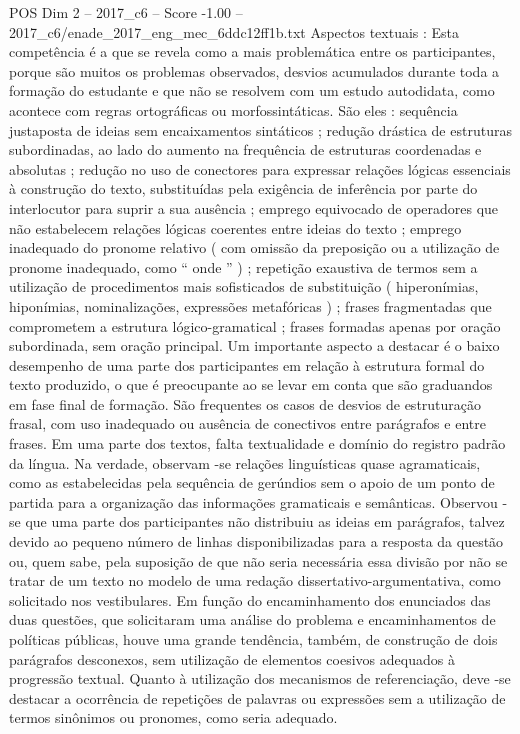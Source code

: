 \begin{textsample}{POS Dim 2 – 2017\_c6 – Score -1.00 – 2017\_c6/enade\_2017\_eng\_mec\_6ddc12ff1b.txt}
Aspectos textuais : Esta competência é a que se revela como a mais problemática entre os participantes, porque são muitos os problemas observados, desvios acumulados durante toda a formação do estudante e que não se resolvem com um estudo autodidata, como acontece com regras ortográficas ou morfossintáticas.
São eles : sequência justaposta de ideias sem encaixamentos sintáticos ; redução drástica de estruturas subordinadas, ao lado do aumento na frequência de estruturas coordenadas e absolutas ; redução no uso de conectores para expressar relações lógicas essenciais à construção do texto, substituídas pela exigência de inferência por parte do interlocutor para suprir a sua ausência ; emprego equivocado de operadores que não estabelecem relações lógicas coerentes entre ideias do texto ; emprego inadequado do pronome relativo ( com omissão da preposição ou a utilização de pronome inadequado, como “ onde ” ) ; repetição exaustiva de termos sem a utilização de procedimentos mais sofisticados de substituição ( hiperonímias, hiponímias, nominalizações, expressões metafóricas ) ; frases fragmentadas que comprometem a estrutura lógico-gramatical ; frases formadas apenas por oração subordinada, sem oração principal.
Um importante aspecto a destacar é o baixo desempenho de uma parte dos participantes em relação à estrutura formal do texto produzido, o que é preocupante ao se levar em conta que são graduandos em fase final de formação.
São frequentes os casos de desvios de estruturação frasal, com uso inadequado ou ausência de conectivos entre parágrafos e entre frases.
Em uma parte dos textos, falta textualidade e domínio do registro padrão da língua.
Na verdade, observam -se relações linguísticas quase agramaticais, como as estabelecidas pela sequência de gerúndios sem o apoio de um ponto de partida para a organização das informações gramaticais e semânticas.
Observou -se que uma parte dos participantes não distribuiu as ideias em parágrafos, talvez devido ao pequeno número de linhas disponibilizadas para a resposta da questão ou, quem sabe, pela suposição de que não seria necessária essa divisão por não se tratar de um texto no modelo de uma redação dissertativo-argumentativa, como solicitado nos vestibulares.
Em função do encaminhamento dos enunciados das duas questões, que solicitaram uma análise do problema e encaminhamentos de políticas públicas, houve uma grande tendência, também, de construção de dois parágrafos desconexos, sem utilização de elementos coesivos adequados à progressão textual.
Quanto à utilização dos mecanismos de referenciação, deve -se destacar a ocorrência de repetições de palavras ou expressões sem a utilização de termos sinônimos ou pronomes, como seria adequado.

\end{textsample}
